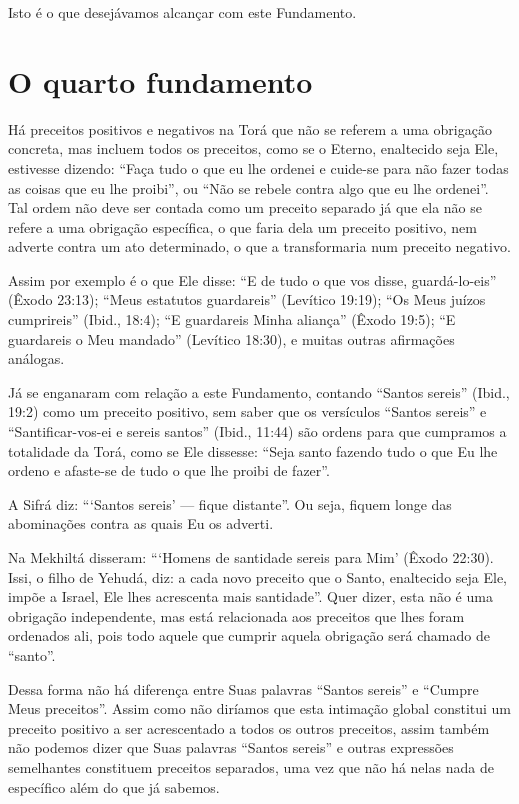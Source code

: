 Isto é o que desejávamos alcançar com este Fundamento.

\chapter*{O quarto fundamento}

Há preceitos positivos e negativos na Torá que não se referem a uma
obrigação concreta, mas incluem todos os preceitos, como se o Eterno,
enaltecido seja Ele, estivesse dizendo: ``Faça tudo o que eu lhe ordenei
e cuide-se para não fazer todas as coisas que eu lhe proibi'', ou ``Não
se rebele contra algo que eu lhe ordenei''. Tal ordem não deve ser
contada como um preceito separado já que ela não se refere a uma
obrigação específica, o que faria dela um preceito positivo, nem adverte
contra um ato determinado, o que a transformaria num preceito negativo.

Assim por exemplo é o que Ele disse: ``E de tudo o que vos disse,
guardá-lo-eis'' (Êxodo 23:13); ``Meus estatutos guardareis'' (Levítico
19:19); ``Os Meus juízos cumprireis'' (Ibid., 18:4); ``E guardareis
Minha aliança'' (Êxodo 19:5); ``E guardareis o Meu mandado'' (Levítico
18:30), e muitas outras afirmações análogas.

Já se enganaram com relação a este Fundamento, contando ``Santos
sereis'' (Ibid., 19:2) como um preceito positivo, sem saber que os
versículos
``Santos sereis'' e ``Santificar-vos-ei e sereis santos'' (Ibid., 11:44)
são ordens para que cumpramos a totalidade da Torá, como se Ele
dissesse: ``Seja santo fazendo tudo o que Eu lhe ordeno e afaste-se de
tudo o que lhe proibi de fazer''.

A Sifrá diz: ```Santos sereis' --- fique distante''. Ou seja, fiquem
longe das abominações contra as quais Eu os adverti.

Na Mekhiltá disseram: ```Homens de santidade sereis para Mim' (Êxodo
22:30). Issi, o filho de Yehudá, diz: a cada novo preceito que o Santo,
enaltecido seja Ele, impõe a Israel, Ele lhes acrescenta mais
santidade''. Quer dizer, esta não é uma obrigação independente, mas está
relacionada aos preceitos que lhes foram ordenados ali, pois todo aquele
que cumprir aquela obrigação será chamado de ``santo''.

Dessa forma não há diferença entre Suas palavras ``Santos sereis'' e
``Cumpre Meus preceitos''. Assim como não diríamos que esta intimação
global constitui um preceito positivo a ser acrescentado a todos os
outros preceitos, assim também não podemos dizer que Suas palavras
``Santos sereis'' e outras expressões semelhantes constituem preceitos
separados, uma vez que não há nelas nada de específico além do que já
sabemos.

